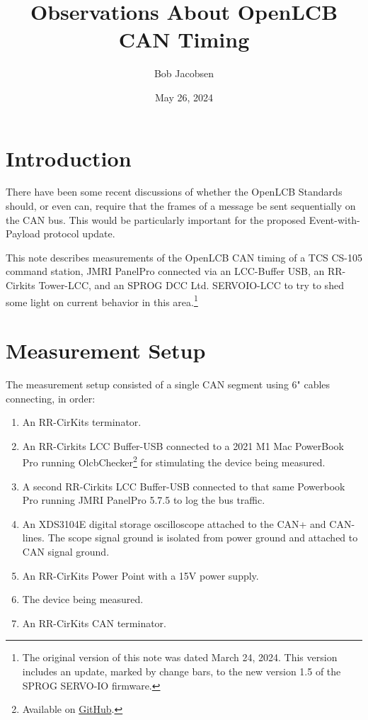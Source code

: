 \documentclass[11pt]{article}
\title{Observations About OpenLCB CAN Timing}
\author{Bob Jacobsen}
\date{May 26, 2024}                                         %
\begin{document}
\maketitle

\newcommand*{\xml}[1]{\texttt{<#1>}}

\newcommand{\ts}{\textsuperscript}

\newcommand{\us}{$\mu$s}

\section{Introduction}

There have been some recent discussions of whether the OpenLCB Standards
should, or even can, require that the frames of a message be sent 
sequentially on the CAN bus. This would be particularly important
for the proposed Event-with-Payload protocol update.

This note describes measurements of the OpenLCB CAN timing of 
a TCS CS-105 command station,
JMRI PanelPro connected via an LCC-Buffer USB, 
an RR-Cirkits Tower-LCC,
and an SPROG DCC Ltd. SERVOIO-LCC
to try to shed some light on 
current behavior in this 
area.\footnote{
The original version of this note was dated March 24, 2024. This
version includes an update, marked by change bars, to the new
version 1.5 of the SPROG SERVO-IO firmware.
}

\section{Measurement Setup}

The measurement setup consisted of a single CAN segment using 6" cables connecting, 
in order:
\begin{enumerate}
\item An RR-CirKits terminator.
\item An RR-Cirkits LCC Buffer-USB connected to a 2021 M1 Mac PowerBook Pro running 
    OlcbChecker\footnote{Available on 
                \href{http://github.com/bobjacobsen/OlcbChecker}{GitHub}. }
    for stimulating the device being measured.
\item A second RR-Cirkits LCC Buffer-USB connected to that same Powerbook Pro running 
    JMRI PanelPro 5.7.5 to log the bus traffic.
\item An XDS3104E digital storage oscilloscope attached to the CAN+ and CAN- lines.
    The scope signal ground is isolated from power ground and attached to CAN signal ground.
\item An RR-CirKits Power Point with a 15V power supply.
\item The device being measured.
\item An RR-CirKits CAN terminator.
\end{enumerate}
\end{document}
